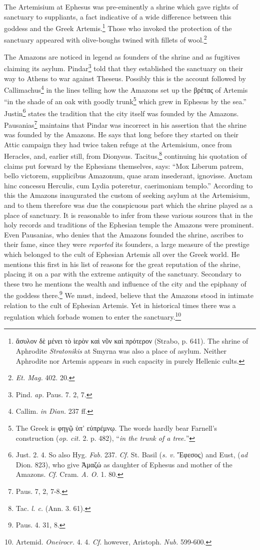 \documentclass[a4paper, 12pt, oneside]{article}
\begin{document}
The Artemisium at Ephesus was pre-eminently a shrine which gave rights of sanctuary to suppliants, a fact indicative of a wide difference between this goddess and the Greek Artemis.\footnote{ἄσυλον δὲ μένει τὸ ἱερὸν καὶ νῦν καὶ πρότερον (Strabo, p. 641). The shrine of Aphrodite \emph{Stratonikis} at Smyrna was also a place of asylum. Neither Aphrodite nor Artemis appears in such capacity in purely Hellenic cults.} Those who invoked the protection of the sanctuary appeared with olive-boughs twined with fillets of wool.\footnote{\emph{Et. Mag.} 402. 20.}

The Amazons are noticed in legend as founders of the shrine and as fugitives claiming its asylum. Pindar\footnote{Pind. \emph{ap.} Paus. 7. 2, 7.} told that they established the sanctuary on their way to Athens to war against Theseus. Possibly this is the account followed by Callimachus\footnote{Callim. \emph{in Dian.} 237 ff.} in the lines telling how the Amazons set up the βρέτας of Artemis ``in the shade of an oak with goodly trunk\footnote{The Greek is φηγῷ ὑπ' εὐπρέμνῳ. The words hardly bear Farnell's construction (\emph{op. cit.} 2. p. 482), ``\emph{in the trunk of a tree.}''} which grew in Ephesus by the sea.'' Justin\footnote{Just. 2. 4. So also Hyg. \emph{Fab.} 237. \emph{Cf.} St. Basil (\emph{s. v.} Ἔφεσος) and Eust, (\emph{ad} Dion. 823), who give Ἀμαζώ as daughter of Ephesus and mother of the Amazons. \emph{Cf.} Cram. \emph{A. O.} 1. 80.} states the tradition that the city itself was founded by the Amazons. Pausanias\footnote{Paus. 7, 2, 7-8.} maintains that Pindar was incorrect in his assertion that the shrine was founded by the Amazons. He says that long before they started on their Attic campaign they had twice taken refuge at the Artemisium, once from Heracles, and, earlier still, from Dionysus. Tacitus,\footnote{Tac. \emph{l. c.} (Ann. 3. 61).} continuing his quotation of claims put forward by the Ephesians themselves, says: ``Mox Liberum patrem, bello victorem, supplicibus Amazonum, quae aram insederant, ignovisse. Auctam hinc concessu Herculis, cum Lydia poteretur, caerimoniam templo.'' According to this the Amazons inaugurated the custom of seeking asylum at the Artemisium, and to them therefore was due the conspicuous part which the shrine played as a place of sanctuary. It is reasonable to infer from these various sources that in the holy records and traditions of the Ephesian temple the Amazons were prominent. Even Pausanias, who denies that the Amazons founded the shrine, ascribes to their fame, since they were \emph{reported} its founders, a large measure of the prestige which belonged to the cult of Ephesian Artemis all over the Greek world. He mentions this first in his list of reasons for the great reputation of the shrine, placing it on a par with the extreme antiquity of the sanctuary. Secondary to these two he mentions the wealth and influence of the city and the epiphany of the goddess there.\footnote{Paus. 4. 31, 8.} We must, indeed, believe that the Amazons stood in intimate relation to the cult of Ephesian Artemis. Yet in historical times there was a regulation which forbade women to enter the sanctuary.\footnote{Artemid. \emph{Oneirocr.} 4. 4. \emph{Cf.} however, Aristoph. \emph{Nub.} 599-600.}
\end{document}
